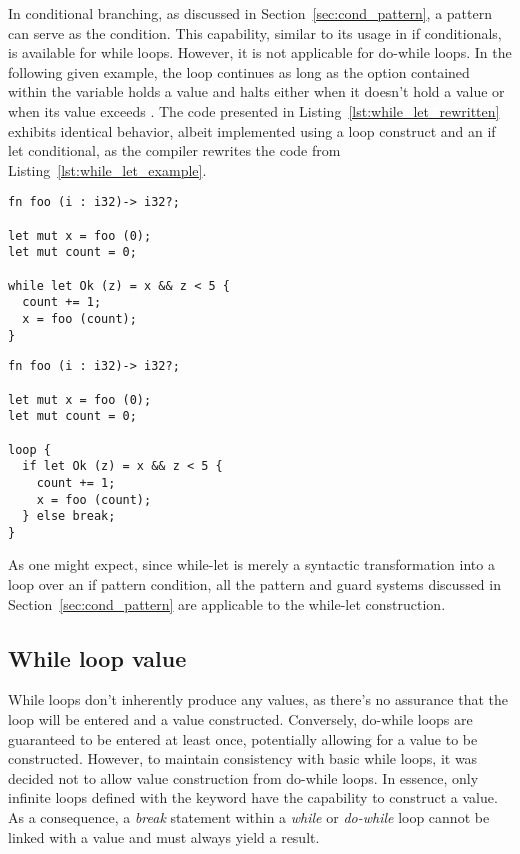 In conditional branching, as discussed in Section~\ref{sec:cond_pattern}, a
pattern can serve as the condition. This capability, similar to its usage in if
conditionals, is available for while loops. However, it is not applicable for
do-while loops. In the following given example, the loop continues as long as
the option contained within the variable  holds a value and halts
either when it doesn't hold a value or when its value exceeds . The
code presented in Listing~\ref{lst:while_let_rewritten} exhibits identical
behavior, albeit implemented using a loop construct and an if let conditional,
as the compiler rewrites the code from Listing~\ref{lst:while_let_example}.

\begin{lstlisting}[style=coloredverbatim, caption=While-let example, label=lst:while_let_example]
fn foo (i : i32)-> i32?;

let mut x = foo (0);
let mut count = 0;

while let Ok (z) = x && z < 5 {
  count += 1;
  x = foo (count);
}
\end{lstlisting}

\begin{lstlisting}[style=coloredverbatim, caption=While-let rewritten using loop and if-let, label=lst:while_let_rewritten]
fn foo (i : i32)-> i32?;

let mut x = foo (0);
let mut count = 0;

loop {
  if let Ok (z) = x && z < 5 {
    count += 1;
    x = foo (count);
  } else break;
}
\end{lstlisting}

As one might expect, since while-let is merely a syntactic transformation into a
loop over an if pattern condition, all the pattern and guard systems discussed
in Section~\ref{sec:cond_pattern} are applicable to the while-let construction.

\subsection{While loop value}

While loops don't inherently produce any values, as there's no assurance that
the loop will be entered and a value constructed. Conversely, do-while loops are
guaranteed to be entered at least once, potentially allowing for a value to be
constructed. However, to maintain consistency with basic while loops, it was
decided not to allow value construction from do-while loops. In essence, only
infinite loops defined with the  keyword have the capability to
construct a value. As a consequence, a \textit{break} statement within a
\textit{while} or \textit{do-while} loop cannot be linked with a value and must
always yield a  result.


